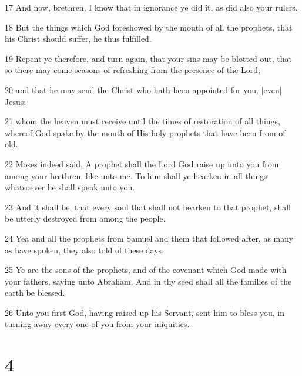 \par 17 And now, brethren, I know that in ignorance ye did it, as did also your rulers.
\par 18 But the things which God foreshowed by the mouth of all the prophets, that his Christ should suffer, he thus fulfilled.
\par 19 Repent ye therefore, and turn again, that your sins may be blotted out, that so there may come seasons of refreshing from the presence of the Lord;
\par 20 and that he may send the Christ who hath been appointed for you, [even] Jesus:
\par 21 whom the heaven must receive until the times of restoration of all things, whereof God spake by the mouth of His holy prophets that have been from of old.
\par 22 Moses indeed said, A prophet shall the Lord God raise up unto you from among your brethren, like unto me. To him shall ye hearken in all things whatsoever he shall speak unto you.
\par 23 And it shall be, that every soul that shall not hearken to that prophet, shall be utterly destroyed from among the people.
\par 24 Yea and all the prophets from Samuel and them that followed after, as many as have spoken, they also told of these days.
\par 25 Ye are the sons of the prophets, and of the covenant which God made with your fathers, saying unto Abraham, And in thy seed shall all the families of the earth be blessed.
\par 26 Unto you first God, having raised up his Servant, sent him to bless you, in turning away every one of you from your iniquities.

\chapter{4}

